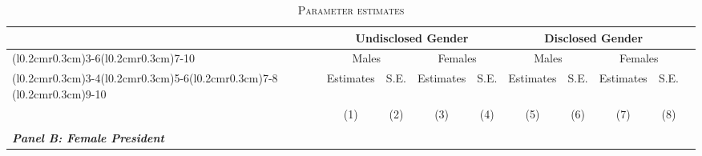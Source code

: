 \documentclass[12pt]{article}
\begin{document}
\begin{landscape}
\begin{table}[htbp]
\caption{\textsc{Parameter estimates}}\label{table:estimates_female_pres}
\centering
\begin{tabular}{lcccccccccc}
\hline
\hline& & \multicolumn{4}{c}{Undisclosed Gender} &\multicolumn{4}{c}{Disclosed Gender}\\
\cmidrule(l{0.2cm}r{0.3cm}){3-6}\cmidrule(l{0.2cm}r{0.3cm}){7-10}
& & \multicolumn{2}{c}{Males} &\multicolumn{2}{c}{Females} & \multicolumn{2}{c}{Males} &\multicolumn{2}{c}{Females}\\
\cmidrule(l{0.2cm}r{0.3cm}){3-4}\cmidrule(l{0.2cm}r{0.3cm}){5-6}\cmidrule(l{0.2cm}r{0.3cm}){7-8} \cmidrule(l{0.2cm}r{0.3cm}){9-10}
& & Estimates  & S.E.  & Estimates  & S.E. & Estimates  & S.E. & Estimates  & S.E. & \tabularnewline
 &  &  (1) & (2) & (3)  & (4) & (5) & (6) & (7) & (8) \\
\hline
\\
\textit{\textbf{Panel B: Female President}} & & & & & & & & & \\


\end{tabular}
\end{table}
\end{landscape}
\end{document}
